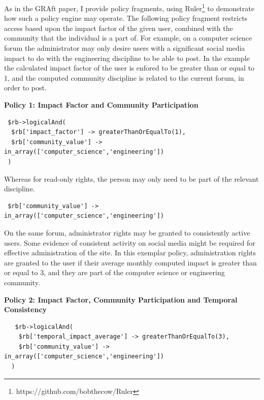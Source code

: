As in the GRAft paper, I provide policy fragments, using Ruler\footnote{https://github.com/bobthecow/Ruler} to demonstrate how such a policy engine may operate. The following policy fragment restricts access based upon the impact factor of the given user, combined with the community that the individual is a part of. For example, on a computer science forum the administrator may only desire users with a significant social media impact to do with the engineering discipline to be able to post. In the example the calculated impact factor of the user is enfored to be greater than or equal to 1, and the computed community discipline is related to the current forum, in order to post. 


\begin{center}
 \textbf{Policy 1: Impact Factor and Community Participation}
\begin{verbatim} 
 $rb->logicalAnd(
  $rb['impact_factor'] -> greaterThanOrEqualTo(1),
  $rb['community_value'] -> in_array(['computer_science','engineering'])
 ) 
\end{verbatim}
\end{center}

Whereas for read-only rights, the person may only need to be part of the relevant discipline.

\begin{verbatim}
 $rb['community_value'] -> in_array(['computer_science','engineering'])
\end{verbatim}

On the same forum, administrator rights may be granted to consistently active users. Some evidence of consistent activity on social media might be required for effective administration of the site. In this exemplar policy, administration rights are granted to the user if their average monthly computed impact is greater than or equal to 3, and they are part of the computer science or engineering community. 

\begin{center}
 \textbf{Policy 2: Impact Factor, Community Participation and Temporal Consistency}
 \begin{verbatim}
   $rb->logicalAnd(
    $rb['temporal_impact_average'] -> greaterThanOrEqualTo(3),
    $rb['community_value'] -> in_array(['computer_science','engineering'])
  ) 
 \end{verbatim}
\end{center}


